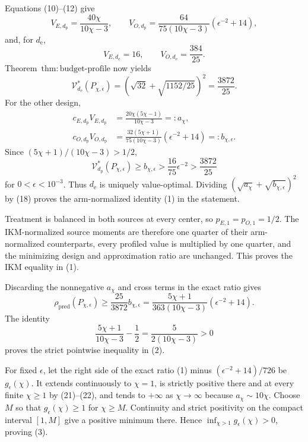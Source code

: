 Equations (10)--(12) give
\[
 V_{E,d_{\mathrm p}}=\frac{40\chi}{10\chi-3},
 \qquad
 V_{O,d_{\mathrm p}}
 =\frac{64}{75(10\chi-3)}(\epsilon^{-2}+14),           \tag{16}
\]
and, for \(d_{\mathrm e}\),
\[
 V_{E,d_{\mathrm e}}=16,\qquad
 V_{O,d_{\mathrm e}}=\frac{384}{25}.                   \tag{17}
\]
Theorem~\(\mathrm{thm{:}budget\text{-}profile}\) now yields
\[
 \mathcal V_{d_{\mathrm e}}^*(P_{\chi,\epsilon})
 =\left(\sqrt{32}+\sqrt{1152/25}\right)^2
 =\frac{3872}{25}.                                     \tag{18}
\]
For the other design,
\[
\begin{aligned}
 c_{E,d_{\mathrm p}}V_{E,d_{\mathrm p}}
 &=\frac{20\chi(5\chi-1)}{10\chi-3}=:a_{\chi},\\
 c_{O,d_{\mathrm p}}V_{O,d_{\mathrm p}}
 &=\frac{32(5\chi+1)}{75(10\chi-3)}
   (\epsilon^{-2}+14)=:b_{\chi,\epsilon}.             \tag{19}
\end{aligned}
\]
Since \((5\chi+1)/(10\chi-3)>1/2\),
\[
 \mathcal V_{d_{\mathrm p}}^*(P_{\chi,\epsilon})
 \ge b_{\chi,\epsilon}
 >\frac{16}{75}\epsilon^{-2}
 >\frac{3872}{25}                                      \tag{20}
\]
for \(0<\epsilon<10^{-3}\). Thus \(d_{\mathrm e}\) is uniquely value-optimal. Dividing \((\sqrt{a_{\chi}}+\sqrt{b_{\chi,\epsilon}})^2\) by (18) proves the arm-normalized identity (1) in the statement.

Treatment is balanced in both sources at every center, so \(p_{E,1}=p_{O,1}=1/2\). The IKM-normalized source moments are therefore one quarter of their arm-normalized counterparts, every profiled value is multiplied by one quarter, and the minimizing design and approximation ratio are unchanged. This proves the IKM equality in (1).

Discarding the nonnegative \(a_\chi\) and cross terms in the exact ratio gives
\[
 \rho_{\mathrm{pred}}(P_{\chi,\epsilon})
 \ge \frac{25}{3872}b_{\chi,\epsilon}
 =\frac{5\chi+1}{363(10\chi-3)}(\epsilon^{-2}+14).     \tag{21}
\]
The identity
\[
 \frac{5\chi+1}{10\chi-3}-\frac12
 =\frac5{2(10\chi-3)}>0                                \tag{22}
\]
proves the strict pointwise inequality in (2).

For fixed \(\epsilon\), let the right side of the exact ratio (1) minus \((\epsilon^{-2}+14)/726\) be \(g_\epsilon(\chi)\). It extends continuously to \(\chi=1\), is strictly positive there and at every finite \(\chi\ge1\) by (21)--(22), and tends to \(+\infty\) as \(\chi\to\infty\) because \(a_\chi\sim10\chi\). Choose \(M\) so that \(g_\epsilon(\chi)\ge1\) for \(\chi\ge M\). Continuity and strict positivity on the compact interval \([1,M]\) give a positive minimum there. Hence \(\inf_{\chi>1}g_\epsilon(\chi)>0\), proving (3).

